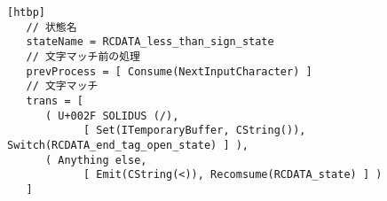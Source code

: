 \documentclass[uplatex,a4j]{jsreport}
\begin{document}
\begin{lstlisting}[basicstyle=\ttfamily\footnotesize, frame=single, caption=RCDATA less-than sign stateの形式化, label=RCDATA形式化][htbp]
   // 状態名
   stateName = RCDATA_less_than_sign_state
   // 文字マッチ前の処理
   prevProcess = [ Consume(NextInputCharacter) ]
   // 文字マッチ
   trans = [
      ( U+002F SOLIDUS (/), 
            [ Set(ITemporaryBuffer, CString()), Switch(RCDATA_end_tag_open_state) ] ),
      ( Anything else, 
            [ Emit(CString(<)), Recomsume(RCDATA_state) ] )
   ]
\end{lstlisting}
\end{document}
